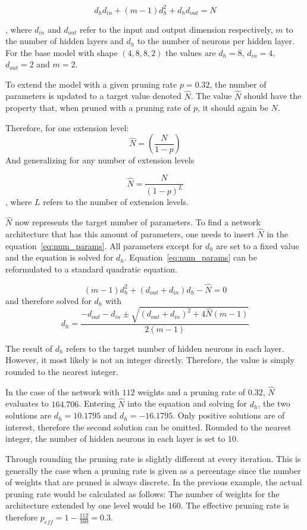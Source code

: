 \begin{equation} \label{eq:num_params}
    d_h d_{in}+(m-1)d_h^2 + d_h d_{out} = N
\end{equation}

, where $d_{in}$ and $d_{out}$ refer to the input and output dimension respectively, $m$ to the number of hidden layers and
$d_h$ to the number of neurons per hidden layer.
For the base model with shape $(4, 8, 8, 2)$ the values are $d_h=8$, 
$d_{in}=4$, $d_{out}=2$ and $m=2$.
 
To extend the model with a given pruning rate $p=0.32$, the number of parameters is updated to a target value denoted $\hat N$.
The value $\hat N$ should have the property that, when pruned with a pruning rate of $p$, it should again be $N$.

Therefore, for one extension level:
\[
\hat N = {(\frac{N}{1-p})}
\]
And generalizing for any number of extension levels

\[
\hat N = {\frac{N}{{(1-p)}^L}}
\]
, where $L$ refers to the number of extension levels.

$\hat N$ now represents the target number of parameters. 
To find a network architecture that has this amount of parameters, one needs to insert $\hat N$ in the equation~\ref{eq:num_params}.
All parameters except for $d_h$ are set to a fixed value and the equation is solved for $d_h$.
Equation~\ref{eq:num_params} can be reformulated to a standard quadratic equation.

\[
    (m-1)d_h^2 + (d_{out} + d_{in}) d_h - \hat N = 0
\]
and therefore solved for $d_h$ with 
\[
    d_h = \frac{
        - d_{out} - d_{in} \pm \sqrt{  {(d_{out} + d_{in})}^2 + 4 \hat N (m-1) } 
    }{
        2(m-1)
    }
\]

The result of $d_h$ refers to the target number of hidden neurons in each layer.
However, it most likely is not an integer directly.
Therefore, the value is simply rounded to the nearest integer.

In the case of the network with $112$ weights and a pruning rate of $0.32$, $\hat N$ evaluates to $164.706$.
Entering $\hat N$ into the equation and solving for $d_h$, the two solutions are $d_h=10.1795$ and $d_h=-16.1795$.
Only positive solutions are of interest, therefore the second solution can be omitted.
Rounded to the nearest integer, the number of hidden neurons in each layer is set to $10$.

Through rounding the pruning rate is slightly different at every iteration.
This is generally the case when a pruning rate is given as a percentage since the number of weights that are pruned is always discrete.
In the previous example, the actual pruning rate would be calculated as follows:
The number of weights for the architecture extended by one level would be $160$.
The effective pruning rate is therefore $p_{eff}=1-\frac{112}{160}=0.3$.

